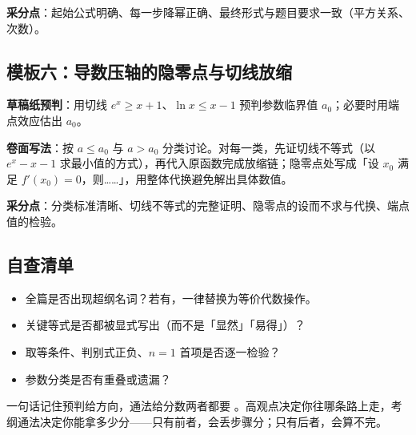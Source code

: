 \textbf{采分点}：起始公式明确、每一步降幂正确、最终形式与题目要求一致（平方关系、次数）。

\subsection*{模板六：导数压轴的隐零点与切线放缩}

\textbf{草稿纸预判}：用切线 $e^x\ge x+1$、$\ln x\le x-1$ 预判参数临界值 $a_0$；必要时用端点效应估出 $a_0$。

\textbf{卷面写法}：按 $a\le a_0$ 与 $a>a_0$ 分类讨论。对每一类，先证切线不等式（以 $e^x-x-1$ 求最小值的方式），再代入原函数完成放缩链；隐零点处写成「设 $x_0$ 满足 $f'(x_0)=0$，则……」，用整体代换避免解出具体数值。

\textbf{采分点}：分类标准清晰、切线不等式的完整证明、隐零点的设而不求与代换、端点值的检验。

\subsection*{自查清单}

\begin{itemize}
  \item 全篇是否出现超纲名词？若有，一律替换为等价代数操作。
  \item 关键等式是否都被显式写出（而不是「显然」「易得」）？
  \item 取等条件、判别式正负、$n=1$ 首项是否逐一检验？
  \item 参数分类是否有重叠或遗漏？
\end{itemize}

\begin{conccard}[一级]{一句话记住}{预判给方向，通法给分数}{两者都要}
。高观点决定你往哪条路上走，考纲通法决定你能拿多少分——只有前者，会丢步骤分；只有后者，会算不完。
\end{conccard}
